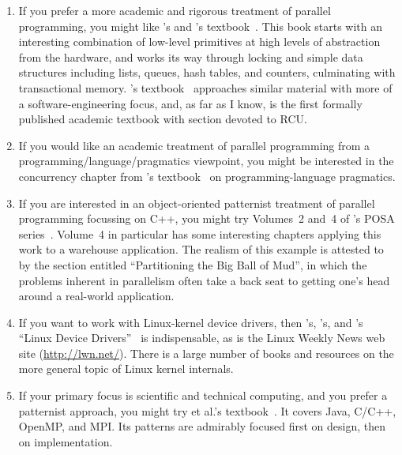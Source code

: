\begin{enumerate}
\item	If you prefer a more academic and rigorous treatment of
	parallel programming,
	you might like 's and 's
	textbook~\cite{HerlihyShavit2008Textbook}.
	This book starts with an interesting combination
	of low-level primitives at high levels of abstraction
	from the hardware, and works its way through locking
	and simple data structures including lists, queues,
	hash tables, and counters, culminating with transactional
	memory.
	's textbook~\cite{MichaelScott2013Textbook}
	approaches similar material with more of a
	software-engineering focus, and, as far as I know, is
	the first formally published academic textbook with
	section devoted to RCU.
\item	If you would like an academic treatment of parallel
	programming from a programming\-/language\-/pragmatics viewpoint,
	you might be interested in the concurrency chapter from
	's
	textbook~\cite{MichaelScott2006Textbook}
	on programming-language pragmatics.
\item	If you are interested in an object-oriented patternist
	treatment of parallel programming focussing on C++,
	you might try Volumes~2 and~4 of 's POSA
	series~\cite{SchmidtStalRohnertBuschmann2000v2Textbook,
	BuschmannHenneySchmidt2007v4Textbook}.
	Volume~4 in particular has some interesting chapters
	applying this work to a warehouse application.
	The realism of this example is attested to by
	the section entitled ``Partitioning the Big Ball of Mud'',
	in which the problems inherent in parallelism often take a back
	seat to getting one's head around a real-world application.
\item	If you want to work with Linux-kernel device drivers,
	then 's, 's,
	and 's
	``Linux Device Drivers''~\cite{CorbetRubiniKroahHartman}
	is indispensable, as is the Linux Weekly News web site
	(\url{http://lwn.net/}).
	There is a large number of books and resources on
	the more general topic of Linux kernel internals.
\item	If your primary focus is scientific and technical computing,
	and you prefer a patternist approach,
	you might try  et al.'s
	textbook~\cite{Mattson2005Textbook}.
	It covers Java, C/C++, OpenMP, and MPI.
	Its patterns are admirably focused first on design,
	then on implementation.

\end{enumerate}
